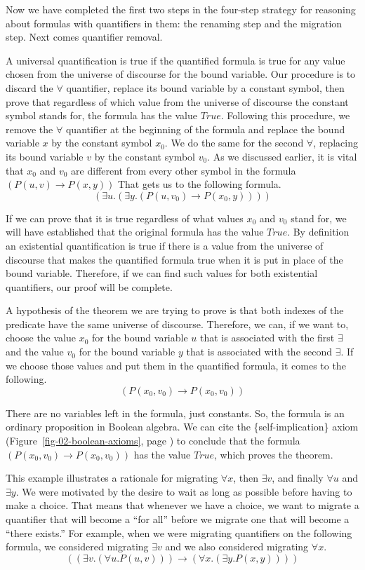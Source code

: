 {Now we have completed the first two steps in the
four-step strategy for reasoning about formulas with quantifiers in them:
the renaming step and the migration step.
Next comes quantifier removal.

A universal quantification is true if
the quantified formula is true for any value
chosen from the universe of discourse for the bound variable.
Our procedure is to discard the $\forall$ quantifier,
replace its bound variable by a constant symbol, then
prove that regardless of which value from the universe of discourse
the constant symbol stands for, the formula has the value $True$.
Following this procedure, we remove the $\forall$ quantifier
at the beginning of the formula and replace the bound variable $x$
by the constant symbol $x_0$.
We do the same for the second $\forall$, replacing its bound variable
$v$ by the constant symbol $v_0$.
As we discussed earlier, it is vital that $x_0$ and $v_0$ are different
from every other symbol in the formula $(P(u, v) \rightarrow P(x, y))$
That gets us to the following formula.
$$(\exists u.(\exists y.(P(u, v_0) \rightarrow P(x_0, y))))$$

If we can prove that it is true regardless of what values
$x_0$ and $v_0$ stand for, we will have established that the
original formula has the value $True$.
By definition an existential quantification is true if
there is a value from the universe of discourse that
makes the quantified formula true when it is put in place of
the bound variable.
Therefore, if we can find such values for both existential
quantifiers, our proof will be complete.

A hypothesis of the theorem we are trying to prove
is that both indexes of the predicate have the same universe of discourse.
Therefore, we can, if we want to,
choose the value $x_0$ for the bound variable $u$
that is associated with the first $\exists$
and the value $v_0$ for the bound variable $y$
that is associated with the second $\exists$.
If we choose those values and put them in the
quantified formula, it comes to the following.
$$(P(x_0, v_0) \rightarrow P(x_0, v_0))$$

There are no variables left in the formula, just constants.
So, the formula is an ordinary proposition in Boolean algebra.
We can cite the \{self-implication\} axiom
(Figure~\ref{fig-02-boolean-axioms}, page \pageref{fig-02-boolean-axioms})
to conclude that the formula $(P(x_0, v_0) \rightarrow P(x_0, v_0))$
has the value $True$, which proves the theorem.

This example illustrates a rationale for migrating
$\forall x$, then $\exists v$, and finally $\forall u$ and $\exists y$.
We were motivated by the desire to wait as long as possible before having to make
a choice. That means that whenever we have a choice, we want to migrate a quantifier
that will become a ``for all'' before we migrate one that will become a ``there exists.''
For example, when we were migrating quantifiers on the following formula, we considered
migrating $\exists v$ and we also considered migrating $\forall x$.
$$((\exists v.(\forall u.P(u, v))) \rightarrow (\forall x.(\exists y.P(x, y))))$$

}
